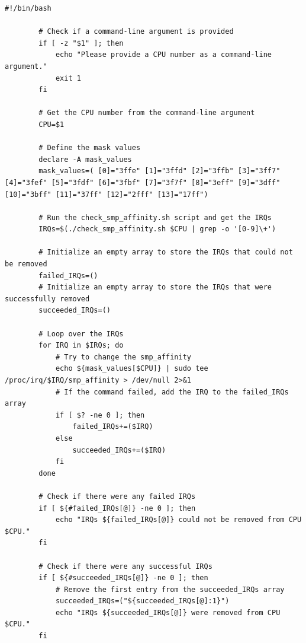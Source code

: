 \documentclass[MMR,Master,english]{twbook}
\begin{document}
\vspace{1em}
\begin{minipage}{0.95\columnwidth}
	\begin{lstlisting}[name={Change IRQ assignment of a CPU},label={script:change_smp_affinity}]
		#!/bin/bash

		# Check if a command-line argument is provided
		if [ -z "$1" ]; then
			echo "Please provide a CPU number as a command-line argument."
			exit 1
		fi
		
		# Get the CPU number from the command-line argument
		CPU=$1
		
		# Define the mask values
		declare -A mask_values
		mask_values=( [0]="3ffe" [1]="3ffd" [2]="3ffb" [3]="3ff7" [4]="3fef" [5]="3fdf" [6]="3fbf" [7]="3f7f" [8]="3eff" [9]="3dff" [10]="3bff" [11]="37ff" [12]="2fff" [13]="17ff")
		
		# Run the check_smp_affinity.sh script and get the IRQs
		IRQs=$(./check_smp_affinity.sh $CPU | grep -o '[0-9]\+')
		
		# Initialize an empty array to store the IRQs that could not be removed
		failed_IRQs=()
		# Initialize an empty array to store the IRQs that were successfully removed
		succeeded_IRQs=()
		
		# Loop over the IRQs
		for IRQ in $IRQs; do
			# Try to change the smp_affinity
			echo ${mask_values[$CPU]} | sudo tee /proc/irq/$IRQ/smp_affinity > /dev/null 2>&1
			# If the command failed, add the IRQ to the failed_IRQs array
			if [ $? -ne 0 ]; then
				failed_IRQs+=($IRQ)
			else
				succeeded_IRQs+=($IRQ)
			fi
		done
		
		# Check if there were any failed IRQs
		if [ ${#failed_IRQs[@]} -ne 0 ]; then
			echo "IRQs ${failed_IRQs[@]} could not be removed from CPU $CPU."
		fi
		
		# Check if there were any successful IRQs
		if [ ${#succeeded_IRQs[@]} -ne 0 ]; then
			# Remove the first entry from the succeeded_IRQs array
			succeeded_IRQs=("${succeeded_IRQs[@]:1}")
			echo "IRQs ${succeeded_IRQs[@]} were removed from CPU $CPU."
		fi		
\end{lstlisting}
\end{minipage}
\end{document}
